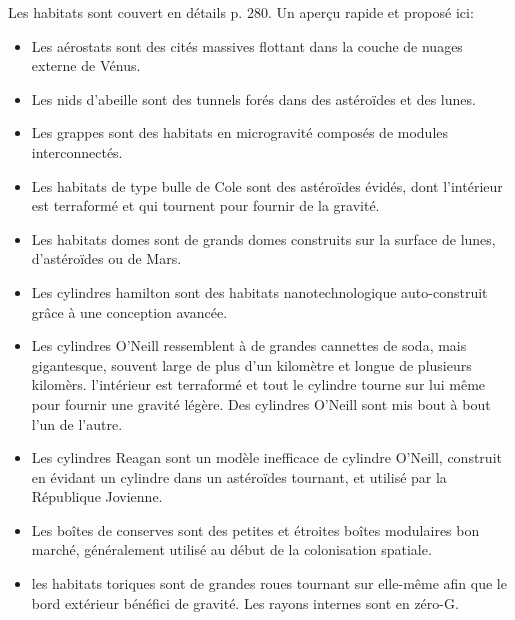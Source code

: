                                                 Les habitats sont couvert en détails p. 280. Un aperçu rapide et proposé ici: 

                                                \begin{itemize} 
                                                   \item Les aérostats sont des cités massives flottant dans la couche de nuages externe de Vénus. 
                                                   \item Les nids d'abeille sont des tunnels forés dans des astéroïdes et des lunes. 
                                                   \item Les grappes sont des habitats en microgravité composés de modules interconnectés. 
                                                   \item Les habitats de type bulle de Cole sont des astéroïdes évidés, dont l'intérieur est terraformé et qui tournent pour fournir de la gravité. 
                                                   \item Les habitats domes sont de grands domes construits sur la surface de lunes, d'astéroïdes ou de Mars. 
                                                   \item Les cylindres hamilton sont des habitats nanotechnologique auto-construit grâce à une conception avancée. 
                                                   \item Les cylindres O'Neill ressemblent à de grandes cannettes de soda, mais gigantesque, souvent large de plus d'un kilomètre et longue de plusieurs kilomèrs. l'intérieur est terraformé et tout le cylindre tourne sur lui même pour fournir une gravité légère. Des cylindres O'Neill sont mis bout à bout l'un de l'autre. 
                                                   \item Les cylindres Reagan sont un modèle inefficace de cylindre O'Neill, construit en évidant un cylindre dans un astéroïdes tournant, et utilisé par la République Jovienne. 
                                                   \item Les boîtes de conserves sont des petites et étroites boîtes modulaires bon marché, généralement utilisé au début de la colonisation spatiale. 
                                                   \item les habitats toriques sont de grandes roues tournant sur elle-même afin que le bord extérieur bénéfici de gravité. Les rayons internes sont en zéro-G. \end{itemize} 

